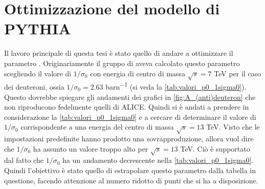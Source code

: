 \section{Ottimizzazione del modello di PYTHIA}
Il lavoro principale di questa tesi è stato quello di andare a ottimizzare il parametro .
Originariamente il gruppo di \pythiaa{} aveva calcolato questo parametro scegliendo il valore di $1/\sigma_0$ con energia di centro di massa $\sqrt s = 7$ TeV per il caso dei deuteroni, ossia $1/\sigma_0 = 2.63$ \si{barn^{-1}} (si veda la \autoref{tab:valori_p0_1sigma0}).
Questo dovrebbe spiegare gli andamenti dei grafici in \autoref{fig:A_(anti)deuteron} che non riproducono fedelmente quelli di ALICE.
Quindi si è andati a prendere in considerazione la \autoref{tab:valori_p0_1sigma0} e a cercare di determinare il valore di $1/\sigma_0$ corrispondente a una energia del centro di massa $\sqrt s = 13$ TeV.
Visto che le impostazioni predefinite hanno prodotto una sovrapproduzione, allora vuol dire che $1/\sigma_0$ ha assunto un valore troppo alto per $\sqrt s = 13$ TeV.
Ciò è supportato dal fatto che $1/\sigma_0$ ha un andamento decrescente nella \autoref{tab:valori_p0_1sigma0}.
Quindi l'obiettivo è stato quello di estrapolare questo parametro dalla tabella in questione, facendo attenzione al numero ridotto di punti che si ha a disposizione.

